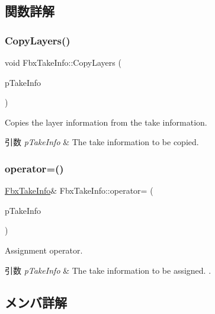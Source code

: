 \subsection{関数詳解}
\mbox{\label{class_fbx_take_info_ac8e073b31c0de56fc7dbfcdd006d4f3f}} 
\subsubsection{\texorpdfstring{Copy\+Layers()}{CopyLayers()}}
{\footnotesize\ttfamily void Fbx\+Take\+Info\+::\+Copy\+Layers (\begin{DoxyParamCaption}\item[{const \hyperlink{class_fbx_take_info}{Fbx\+Take\+Info} \&}]{p\+Take\+Info }\end{DoxyParamCaption})}

Copies the layer information from the take information. 
\begin{DoxyParams}{引数}
{\em p\+Take\+Info} & The take information to be copied. \\
\hline
\end{DoxyParams}
\mbox{\label{class_fbx_take_info_abbce118f64f716e965162ddcaacc024b}} 
\subsubsection{\texorpdfstring{operator=()}{operator=()}}
{\footnotesize\ttfamily \hyperlink{class_fbx_take_info}{Fbx\+Take\+Info}\& Fbx\+Take\+Info\+::operator= (\begin{DoxyParamCaption}\item[{const \hyperlink{class_fbx_take_info}{Fbx\+Take\+Info} \&}]{p\+Take\+Info }\end{DoxyParamCaption})}

Assignment operator. 
\begin{DoxyParams}{引数}
{\em p\+Take\+Info} & The take information to be assigned. . \\
\hline
\end{DoxyParams}


\subsection{メンバ詳解}
\mbox{\label{class_fbx_take_info_a77d4856b8de2b91d9f84baaa97529240}} 
